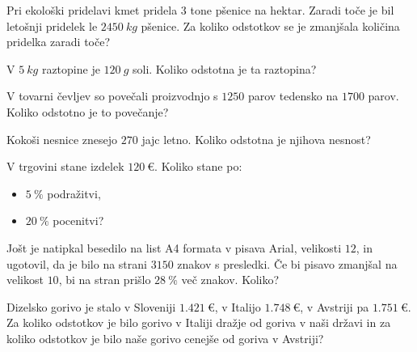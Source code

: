     
            
            
                \begin{naloga}
                    Pri ekološki pridelavi kmet pridela $3$ tone pšenice na hektar. 
                    Zaradi toče je bil letošnji pridelek le $2450~kg$ pšenice.
                    Za koliko odstotkov se je zmanjšala količina pridelka zaradi toče? 
                \end{naloga}
    
                \begin{naloga}
                    V $5~kg$ raztopine je $120~g$ soli. Koliko odstotna je ta raztopina? 
                \end{naloga}
    
                \begin{naloga}
                    V tovarni čevljev so povečali proizvodnjo s $1250$ parov tedensko na $1700$ parov.
                    Koliko odstotno je to povečanje? 
                \end{naloga}
            
    
            
                \begin{naloga}
                    Kokoši nesnice znesejo $270$ jajc letno. 
                    Koliko odstotna je njihova nesnost? 
                \end{naloga}
    
                \begin{naloga}
                    V trgovini stane izdelek $120~€$. Koliko stane po:
                    \begin{itemize}
                        \item $5~\%$ podražitvi,
                        \item $20~\%$ pocenitvi?
                    \end{itemize}
                \end{naloga}
    
                \begin{naloga}
                    Jošt je natipkal besedilo na list A4 formata v pisava Arial, velikosti $12$, in ugotovil, da je bilo na strani $3150$ znakov s presledki.
                    Če bi pisavo zmanjšal na velikost $10$, bi na stran prišlo $28~\%$ več znakov. Koliko? 
                \end{naloga}
            
    
            
            
                \begin{naloga}
                    Dizelsko gorivo je stalo v Sloveniji $1.421~€$, v Italijo $1.748~€$, v Avstriji pa $1.751~€$.
                    Za koliko odstotkov je bilo gorivo v Italiji dražje od goriva v naši državi in za koliko odstotkov je bilo
                    naše gorivo cenejše od goriva v Avstriji? 
                \end{naloga}
    
